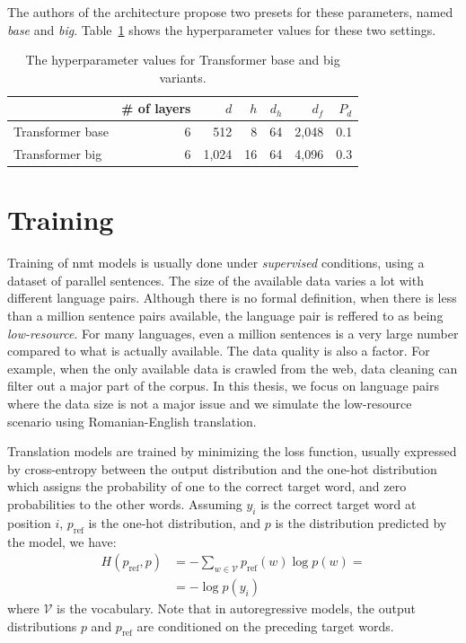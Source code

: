 The authors of the architecture propose two presets for these parameters, named
\emph{base} and \emph{big}. Table~\ref{tab:transformer-hyperparams} shows the
hyperparameter values for these two settings.

\begin{table}
  \centering
  \begin{tabular}{lrrrrrr}
    \toprule
      & \# of layers &  $d$  &  $h$  & $d_h$ & $d_f$ & $P_d$ \\
    \midrule
    Transformer base  & 6 &  512  & 8 & 64 &  2,048 & 0.1 \\
    Transformer big  & 6 &  1,024  & 16 & 64 &  4,096 & 0.3 \\
    \bottomrule
  \end{tabular}
  \caption{The hyperparameter values for Transformer base and big variants.}%
  \label{tab:transformer-hyperparams}
\end{table}


\section{Training}
\label{sec:training}

Training of \gls{nmt} models is usually done under \emph{supervised}
conditions, using a dataset of parallel sentences.  The size of the available data varies a lot with
different language pairs. Although there is no formal definition, when there is
less than a million sentence pairs available, the language pair is reffered to
as being \emph{low-resource}. For many languages, even a million sentences is a
very large number compared to what is actually available. The data quality is
also a factor. For example, when the only available data is crawled from the
web, data cleaning can filter out a major part of the corpus. In this thesis,
we focus on language pairs where the data size is not a major issue and we
simulate the low-resource scenario using Romanian-English translation.

Translation models are trained by minimizing the loss function, usually
expressed by cross-entropy between the output distribution and the one-hot
distribution which assigns the probability of one to the correct target word,
and zero probabilities to the other words. Assuming $y_i$ is the correct target
word at position $i$, $p_{\text{ref}}$ is the one-hot distribution, and $p$ is
the distribution predicted by the model, we have:
%
\begin{equation}
  \begin{split}
    H(p_{\text{ref}}, p) &=  - \sum_{w \in \mathcal{V}} p_{\text{ref}}(w) \log p(w) = \\
    &=  - \log p(y_i)
  \end{split}
\end{equation}
%
where $\mathcal{V}$ is the vocabulary. Note that in autoregressive models, the
output distributions $p$ and $p_{\text{ref}}$ are conditioned on the preceding
target words.

